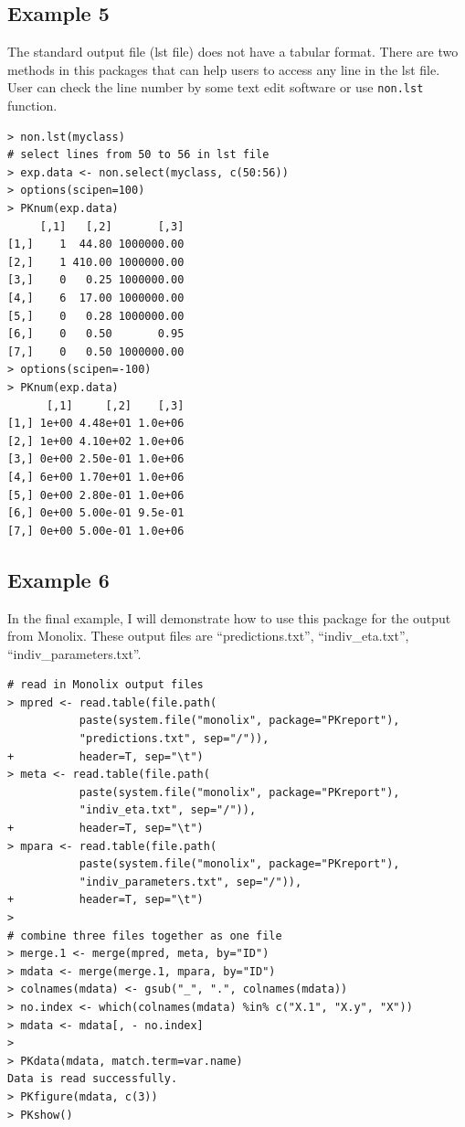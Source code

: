 \documentclass[a4paper]{article}
\begin{document}
\subsection{Example 5}
The standard output file (lst file) does not have a tabular format. There are two methods in this packages that can help users to access any line in the lst file. User can check the line number by some text edit software or use \texttt{non.lst} function.
\begin{verbatim}
> non.lst(myclass)
# select lines from 50 to 56 in lst file
> exp.data <- non.select(myclass, c(50:56))
> options(scipen=100)
> PKnum(exp.data)
     [,1]   [,2]       [,3]
[1,]    1  44.80 1000000.00
[2,]    1 410.00 1000000.00
[3,]    0   0.25 1000000.00
[4,]    6  17.00 1000000.00
[5,]    0   0.28 1000000.00
[6,]    0   0.50       0.95
[7,]    0   0.50 1000000.00
> options(scipen=-100)
> PKnum(exp.data)
      [,1]     [,2]    [,3]
[1,] 1e+00 4.48e+01 1.0e+06
[2,] 1e+00 4.10e+02 1.0e+06
[3,] 0e+00 2.50e-01 1.0e+06
[4,] 6e+00 1.70e+01 1.0e+06
[5,] 0e+00 2.80e-01 1.0e+06
[6,] 0e+00 5.00e-01 9.5e-01
[7,] 0e+00 5.00e-01 1.0e+06
\end{verbatim}

\subsection{Example 6}
In the final example, I will demonstrate how to use this package for the output from Monolix. 
These output files are ``predictions.txt'', ``indiv\_eta.txt'', ``indiv\_parameters.txt''.

\begin{verbatim}
# read in Monolix output files
> mpred <- read.table(file.path(
		   paste(system.file("monolix", package="PKreport"), 
		   "predictions.txt", sep="/")),
+          header=T, sep="\t")
> meta <- read.table(file.path(
           paste(system.file("monolix", package="PKreport"), 
		   "indiv_eta.txt", sep="/")),
+          header=T, sep="\t")
> mpara <- read.table(file.path(
		   paste(system.file("monolix", package="PKreport"), 
		   "indiv_parameters.txt", sep="/")),
+          header=T, sep="\t")
> 
# combine three files together as one file
> merge.1 <- merge(mpred, meta, by="ID")
> mdata <- merge(merge.1, mpara, by="ID")
> colnames(mdata) <- gsub("_", ".", colnames(mdata))
> no.index <- which(colnames(mdata) %in% c("X.1", "X.y", "X"))
> mdata <- mdata[, - no.index] 
> 
> PKdata(mdata, match.term=var.name)
Data is read successfully.
> PKfigure(mdata, c(3))
> PKshow()
\end{verbatim}
\end{document}
